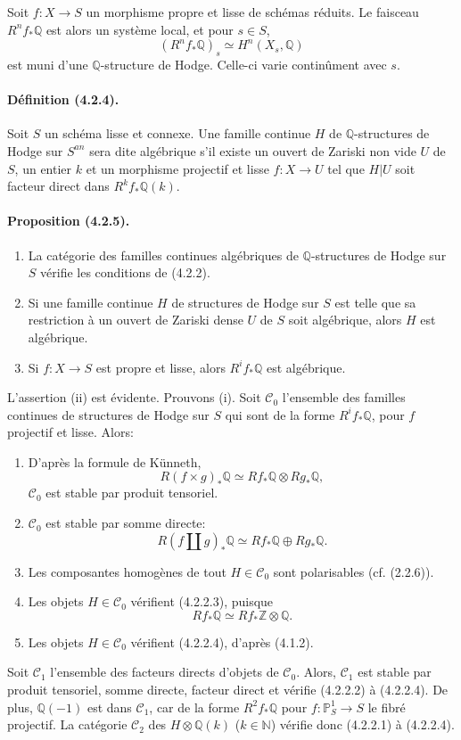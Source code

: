 \documentclass[10pt]{article}
\newcommand{\Q}{\mathbb Q}
\newcommand{\Z}{\mathbb Z}
\newcommand{\N}{\mathbb N}
\newcommand{\bbP}{\mathbb P}
\begin{document}
Soit $f:X\to S$ un morphisme propre et lisse de schémas réduits. Le faisceau $R^nf_*\Q$ est alors un système local, et pour $s\in S$,
\[
(R^nf_*\Q)_s\simeq H^n(X_s,\Q)
\]
est muni d'une $\Q$-structure de Hodge. Celle-ci varie continûment avec $s$.

\paragraph{Définition (4.2.4).} Soit $S$ un schéma lisse et connexe. Une famille continue $H$ de $\Q$-structures de Hodge sur $S^{an}$ sera dite algébrique s'il existe un ouvert de Zariski non vide $U$ de $S$, un entier $k$ et un morphisme projectif et lisse $f:X\to U$ tel que $H|U$ soit facteur direct dans $R^kf_*\Q(k)$.

\paragraph{Proposition (4.2.5).}
\begin{enumerate}[label=(\roman*)]
\item La catégorie des familles continues algébriques de $\Q$-structures de Hodge sur $S$ vérifie les conditions de (4.2.2).
\item Si une famille continue $H$ de structures de Hodge sur $S$ est telle que sa restriction à un ouvert de Zariski dense $U$ de $S$ soit algébrique, alors $H$ est algébrique.
\item Si $f:X\to S$ est propre et lisse, alors $R^if_*\Q$ est algébrique.
\end{enumerate}

L'assertion (ii) est évidente. Prouvons (i). Soit $\mathcal C_0$ l'ensemble des familles continues de structures de Hodge sur $S$ qui sont de la forme $R^if_*\Q$, pour $f$ projectif et lisse. Alors:
\begin{enumerate}[label=\alph*)]
\item D'après la formule de Künneth,
\[
R(f\times g)_*\Q\simeq Rf_*\Q\otimes Rg_*\Q,
\]
$\mathcal C_0$ est stable par produit tensoriel.
\item $\mathcal C_0$ est stable par somme directe:
\[
R(f\amalg g)_*\Q\simeq Rf_*\Q\oplus Rg_*\Q.
\]
\end{enumerate}



\begin{enumerate}[label=\alph*)]
\setcounter{enumi}{2}
\item Les composantes homogènes de tout $H\in\mathcal C_0$ sont polarisables (cf. (2.2.6)).
\item Les objets $H\in\mathcal C_0$ vérifient (4.2.2.3), puisque
\[
Rf_*\Q\simeq Rf_*\Z\otimes\Q.
\]
\item Les objets $H\in\mathcal C_0$ vérifient (4.2.2.4), d'après (4.1.2).
\end{enumerate}
Soit $\mathcal C_1$ l'ensemble des facteurs directs d'objets de $\mathcal C_0$. Alors, $\mathcal C_1$ est stable par produit tensoriel, somme directe, facteur direct et vérifie (4.2.2.2) à (4.2.2.4). De plus, $\Q(-1)$ est dans $\mathcal C_1$, car de la forme $R^2f_*\Q$ pour $f:\bbP^1_S\to S$ le fibré projectif. La catégorie $\mathcal C_2$ des $H\otimes\Q(k)$ ($k\in\N$) vérifie donc (4.2.2.1) à (4.2.2.4).
\end{document}
